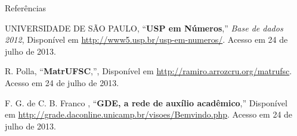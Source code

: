 \documentclass[final]{beamer}
\begin{document}
\begin{frame}[t]
\begin{columns}[t]
\begin{column}{0.35\columnwidth}
	\end{column}

	\begin{column}{0.61\columnwidth}
		\begin{block}{Referências}
			\footnotesize{\begin{thebibliography}{99}
			UNIVERSIDADE DE SÃO PAULO, ``\textbf{USP em Números},'' \emph{Base de dados 2012},
			Disponível em \url{http://www5.usp.br/usp-em-numeros/}. Acesso em 24 de julho de 2013.

			R. Polla, ``\textbf{MatrUFSC},'',
			Disponível em \url{http://ramiro.arrozcru.org/matrufsc}. Acesso em 24 de julho de 2013.

			F. G. de C. B. Franco , ``\textbf{GDE, a rede de auxílio acadêmico},''
			Disponível em \url{http://grade.daconline.unicamp.br/visoes/Bemvindo.php}. Acesso em 24 de julho de 2013.
			\end{thebibliography}}

		\end{block}
	
	\end{column}
\end{columns}


\end{frame}
\end{document}
